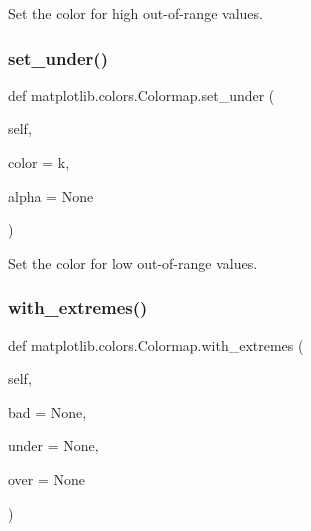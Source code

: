 \begin{DoxyVerb}Set the color for high out-of-range values.\end{DoxyVerb}
 \mbox{\label{classmatplotlib_1_1colors_1_1Colormap_ac1c99fa9d2a3b5ac1000b3f76ed03599}} 
\subsubsection{\texorpdfstring{set\+\_\+under()}{set\_under()}}
{\footnotesize\ttfamily def matplotlib.\+colors.\+Colormap.\+set\+\_\+under (\begin{DoxyParamCaption}\item[{}]{self,  }\item[{}]{color = {\ttfamily \textquotesingle{}k\textquotesingle{}},  }\item[{}]{alpha = {\ttfamily None} }\end{DoxyParamCaption})}

\begin{DoxyVerb}Set the color for low out-of-range values.\end{DoxyVerb}
 \mbox{\label{classmatplotlib_1_1colors_1_1Colormap_a57afd28dbb0631d58b662c7a53858e21}} 
\subsubsection{\texorpdfstring{with\+\_\+extremes()}{with\_extremes()}}
{\footnotesize\ttfamily def matplotlib.\+colors.\+Colormap.\+with\+\_\+extremes (\begin{DoxyParamCaption}\item[{}]{self,  }\item[{}]{bad = {\ttfamily None},  }\item[{}]{under = {\ttfamily None},  }\item[{}]{over = {\ttfamily None} }\end{DoxyParamCaption})}

